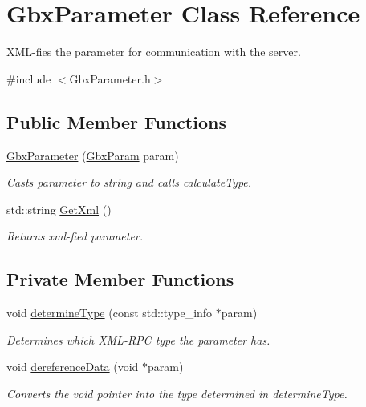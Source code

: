 \hypertarget{classGbxParameter}{\section{Gbx\-Parameter Class Reference}
\label{classGbxParameter}
}


X\-M\-L-\/fies the parameter for communication with the server.  




{\ttfamily \#include $<$Gbx\-Parameter.\-h$>$}

\subsection*{Public Member Functions}
\begin{DoxyCompactItemize}
\item 
\hyperlink{classGbxParameter_a6cfd5c21c176ca6d9d2a1a3d9ad9953c}{Gbx\-Parameter} (\hyperlink{structGbxParam}{Gbx\-Param} param)
\begin{DoxyCompactList}\small\item\em Casts parameter to string and calls calculate\-Type. \end{DoxyCompactList}\item 
std\-::string \hyperlink{classGbxParameter_a3c6800bca78c5bb4ed7de62cf552ee35}{Get\-Xml} ()
\begin{DoxyCompactList}\small\item\em Returns xml-\/fied parameter. \end{DoxyCompactList}\end{DoxyCompactItemize}
\subsection*{Private Member Functions}
\begin{DoxyCompactItemize}
\item 
void \hyperlink{classGbxParameter_af708857623b85684ede2ae002e53a118}{determine\-Type} (const std\-::type\-\_\-info $\ast$param)
\begin{DoxyCompactList}\small\item\em Determines which X\-M\-L-\/\-R\-P\-C type the parameter has. \end{DoxyCompactList}\item 
void \hyperlink{classGbxParameter_a8e038bca99e1eb7339567fe1af79586c}{dereference\-Data} (void $\ast$param)
\begin{DoxyCompactList}\small\item\em Converts the void pointer into the type determined in determine\-Type. \end{DoxyCompactList}\end{DoxyCompactItemize}
